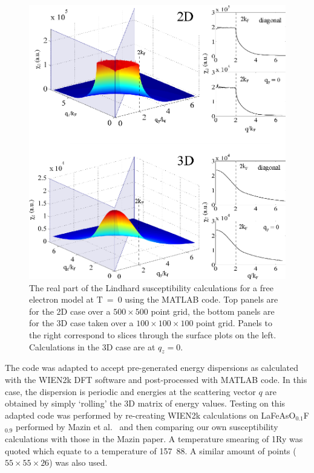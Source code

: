 \begin{figure}[htbp]
    \begin{center}
        \includegraphics[scale=0.9]{Chapter-ExperimentalTechnique/Figures/Susceptibility/FreeElectron/FreeElectron}
        \caption{The real part of the Lindhard susceptibility calculations for a free electron model at \unit{T=0}{\kelvin} using the MATLAB  code. Top panels are for the 2D case over a $500\times500$ point grid, the bottom panels are for the 3D case taken over a $100\times100\times100$ point grid. Panels to the right correspond to slices through the surface plots on the left. Calculations in the 3D case are at $q_z=0$.}
        \label{Fig:Exp:FreeElectronSusceptibility}
    \end{center}
\end{figure}


The code was adapted to accept pre-generated energy dispersions as calculated with the WIEN2k DFT software and post-processed with MATLAB code. In this case, the dispersion is periodic and energies at the scattering vector $q$ are obtained by simply `rolling' the 3D matrix of energy values. Testing on this adapted code was performed by re-creating WIEN2k calculations on LaFeAsO$_{0.1}$F$_{0.9}$ performed by Mazin et al.~\cite{Mazin2008} and then comparing our own susceptibility calculations with those in the Mazin paper. A temperature smearing of \unit{1}{\milli\textrm{Ry}} was quoted which equate to a temperature of \unit{157.88}{\kelvin}. A similar amount of points ($55\times55\times26$) was also used.

